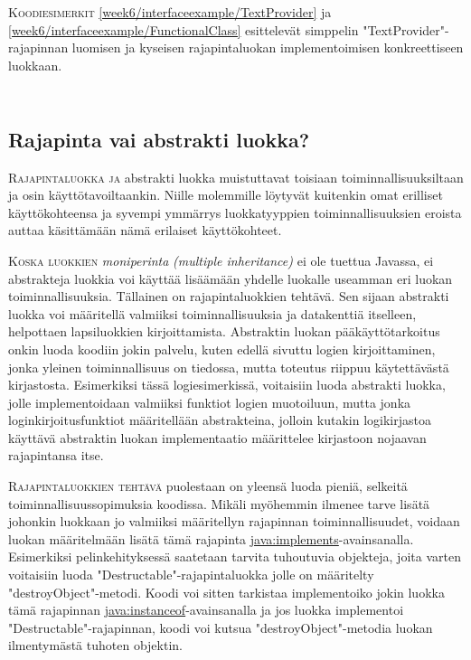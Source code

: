 \documentclass[openany]{book}
\newcommand{\newthought}[1]{\smallskip\textsc{#1}}
\newcommand{\eng}[1]{\textit{(#1)}}
\newcommand{\new}[1]{\textit{\gls{#1}}}
\newcommand{\neweng}[2]{\new{#1} \eng{#2}}
\newcommand{\java}[1]{\underline{\gls{java:#1}}}
\newcommand{\code}[3]{
	\begin{listing}
		\linespread{0.85}
		\inputminted{java}{OhjelmointiopasEsimerkit/src/#1/#2.java}
		\caption{#1: #3}
		\label{#1/#2}
	\end{listing}
}
\begin{document}
\newthought{Koodiesimerkit} \ref{week6/interfaceexample/TextProvider} ja
\ref{week6/interfaceexample/FunctionalClass} esittelevät simppelin "TextProvider"-rajapinnan
luomisen ja kyseisen rajapintaluokan implementoimisen konkreettiseen luokkaan.

\code{week6/interfaceexample}{TextProvider}{TextProvider rajapintaluokka}
\code{week6/interfaceexample}{FunctionalClass}{Luokka, joka implementoi TextProvider-rajapinnan}

\subsection{Rajapinta vai abstrakti luokka?}
\label{interface v abstract}

\newthought{Rajapintaluokka ja} abstrakti luokka muistuttavat toisiaan toiminnallisuuksiltaan ja
osin käyttötavoiltaankin. Niille molemmille löytyvät kuitenkin omat erilliset käyttökohteensa ja
syvempi ymmärrys luokkatyyppien toiminnallisuuksien eroista auttaa käsittämään nämä erilaiset
käyttökohteet.

\newthought{Koska luokkien} \neweng{moniperinta}{multiple inheritance} ei ole tuettua Javassa, ei
abstrakteja luokkia voi käyttää lisäämään yhdelle luokalle useamman eri luokan toiminnallisuuksia.
Tällainen on rajapintaluokkien tehtävä. Sen sijaan abstrakti luokka voi määritellä valmiiksi
toiminnallisuuksia ja datakenttiä itselleen, helpottaen lapsiluokkien kirjoittamista. Abstraktin
luokan pääkäyttötarkoitus onkin luoda koodiin jokin palvelu, kuten edellä sivuttu logien	
kirjoittaminen, jonka yleinen toiminnallisuus on tiedossa, mutta toteutus riippuu käytettävästä
kirjastosta. Esimerkiksi tässä logiesimerkissä, voitaisiin luoda abstrakti luokka, jolle
implementoidaan valmiiksi funktiot logien muotoiluun, mutta jonka loginkirjoitusfunktiot
määritellään abstrakteina, jolloin kutakin logikirjastoa käyttävä abstraktin luokan implementaatio
määrittelee kirjastoon nojaavan rajapintansa itse.

\newthought{Rajapintaluokkien tehtävä} puolestaan on yleensä luoda pieniä, selkeitä
toiminnallisuussopimuksia koodissa. Mikäli myöhemmin ilmenee tarve lisätä johonkin luokkaan jo
valmiiksi määritellyn rajapinnan toiminnallisuudet, voidaan luokan määritelmään lisätä tämä
rajapinta \java{implements}-avainsanalla. Esimerkiksi pelinkehityksessä saatetaan tarvita
tuhoutuvia objekteja, joita varten voitaisiin luoda "Destructable"-rajapintaluokka jolle on
määritelty "destroyObject"-metodi. Koodi voi sitten tarkistaa implementoiko jokin luokka tämä
rajapinnan \java{instanceof}-avainsanalla ja jos luokka implementoi "Destructable"-rajapinnan,
koodi voi kutsua "destroyObject"-metodia luokan ilmentymästä tuhoten objektin.
\end{document}
